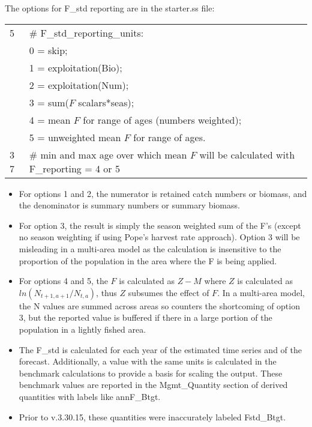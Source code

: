 The options for F\_std reporting are in the starter.ss file:
\begin{center}
	\begin{longtable}{p{2cm} p{12cm}}
		\hline
		5 & \# F\_std\_reporting\_units: \Tstrut\\
		  & 0 = skip; \\
		  & 1 = exploitation(Bio); \\
		  & 2 = exploitation(Num); \\ 
		  & 3 = sum($F$ scalars*seas); \\
		  & 4 = mean $F$ for range of ages (numbers weighted); \\
		  & 5 = unweighted mean $F$ for range of ages. \Bstrut\\
		\hline
		3 7 & \# min and max age over which mean $F$ will be calculated with F\_reporting = 4 or 5 \Tstrut\Bstrut\\
		\hline
	\end{longtable}
	\vspace*{-1.7\baselineskip}
\end{center}

\begin{itemize}
	\item For options 1 and 2, the numerator is retained catch numbers or biomass, and the denominator is summary numbers or summary biomass.
	\item For option 3, the result is simply the season weighted sum of the F's (except no season weighting if using Pope's harvest rate approach). Option 3 will be misleading in a multi-area model as the calculation is insensitive to the proportion of the population in the area where the F is being applied.
	\item For options 4 and 5, the $F$ is calculated as $Z-M$ where $Z$ is calculated as $ln(N_{t+1,a+1}/N_{t,a})$, thus $Z$ subsumes the effect of $F$.  In a multi-area model, the N values are summed across areas so counters the shortcoming of option 3, but the reported value is buffered if there in a large portion of the population in a lightly fished area.
	\item The F\_std is calculated for each year of the estimated time series and of the forecast. Additionally, a value with the same units is calculated in the benchmark calculations to provide a basis for scaling the output. These benchmark values are reported in the Mgmt\_Quantity section of derived quantities with labels like annF\_Btgt. 
	\item Prior to v.3.30.15, these quantities were inaccurately labeled Fstd\_Btgt.
\end{itemize}

